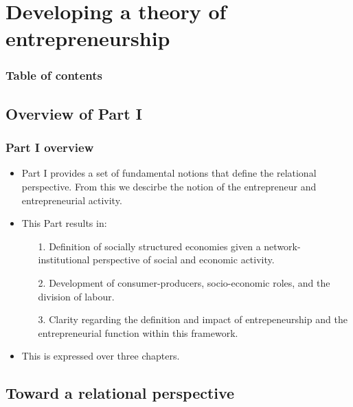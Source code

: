 \documentclass[10pt]{beamer}
\begin{document}
\section{Developing a theory of entrepreneurship}

\begin{frame}
\frametitle{Table of contents}
\tableofcontents[currentsection]
\end{frame}

\subsection{Overview of Part I}

\begin{frame} \frametitle{Part I overview}
\begin{itemize}
\item Part I provides a set of fundamental notions that define the relational perspective. From this we descirbe the notion of the entrepreneur and entrepreneurial activity.
\medskip
\item This Part results in:
\begin{itemize}
\medskip
\item[1.] Definition of socially structured economies given a network-institutional perspective of social and economic activity.
\medskip
\item[2.] Development of consumer-producers, socio-economic roles, and the division of labour.
\medskip
\item[3.] Clarity regarding the definition and impact of entrepeneurship and the entrepreneurial function within this framework.
\end{itemize}
\medskip
\item This is expressed over three chapters.
\end{itemize}
\end{frame}

\subsection{Toward a relational perspective}
\end{document}

